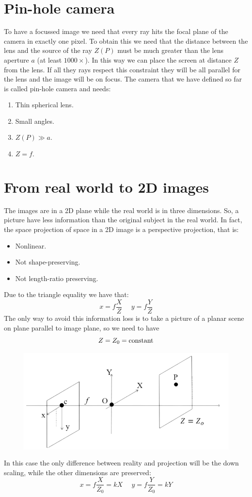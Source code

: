\documentclass[12pt, a4paper]{report}
\newtheorem[style=M,bodystyle=\normalfont]{theorem}{Theorem}
\newtheorem[style=M,bodystyle=\normalfont]{corollary}{Corollary}
\newtheorem[style=M,bodystyle=\normalfont]{lemma}{Lemma}
\newtheorem[style=M,bodystyle=\normalfont]{definition}{Definition}
\begin{document}
    \section{Pin-hole camera}
    To have a focussed image we need that every ray hits the focal plane of the camera in exactly one pixel. To obtain this we need that the distance between the lens and
    the source of the ray $Z(P)$ must be much greater than the lens aperture $a$ (at least $1000\times$). In this way we can place the screen at distance $Z$ from the lens. If all they rays
    respect this constraint they will be all parallel for the lens and the image will be on focus. The camera that we have defined so far is called pin-hole camera and needs:
    \begin{enumerate}
        \item Thin spherical lens. 
        \item Small angles.
        \item $Z(P) \gg a$.
        \item $Z=f$.
    \end{enumerate}

    \section{From real world to 2D images}
    The images are in a 2D plane while the real world is in three dimensions. So, a picture have less information than the original subject in the real world. In fact, the space 
    projection of space in a 2D image is a perspective projection, that is: 
    \begin{itemize}
        \item Nonlinear.
        \item Not shape-preserving.
        \item Not length-ratio preserving. 
    \end{itemize}
    Due to the triangle equality we have that:
    \[x=f \dfrac{X}{Z} \:\:\:\:\:\: y=f \dfrac{Y}{Z}\]
    The only way to avoid this information loss is to take a picture of a planar scene on plane parallel to image plane, so we need to have 
    \[Z=Z_0=\textnormal{constant}\]
    \begin{figure}[H]
        \centering
        \includegraphics[width=0.5\linewidth]{images/Z0.png}
    \end{figure}
    In this case the only difference between reality and projection will be the down scaling, while the other dimensions are preserved: 
    \[x=f \dfrac{X}{Z_0}=kX \:\:\:\:\:\: y=f \dfrac{Y}{Z_0}=kY \]
    
\end{document}
